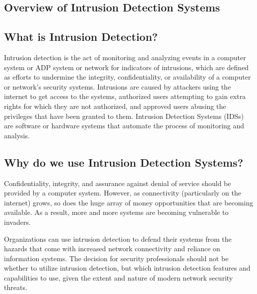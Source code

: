 \documentclass[12pt]{article}
\begin{document}
    \begin{center}
        \huge{\section{Overview of Intrusion Detection Systems}\label{sec:intro}}
    \end{center}
    
    \subsection{What is Intrusion Detection?} 
    \par Intrusion detection is the act of monitoring and analyzing events in a computer system or ADP system or network for indicators of intrusions, which are defined as efforts to undermine the integrity, confidentiality, or availability of a computer or network's security systems. Intrusions are caused by attackers using the internet to get access to the systems, authorized users attempting to gain extra rights for which they are not authorized, and approved users abusing the privileges that have been granted to them. Intrusion Detection Systems (IDSs) are software or hardware systems that automate the process of monitoring and analysis.
    \\
    
    \subsection{Why do we use Intrusion Detection Systems?}
    \par Confidentiality, integrity, and assurance against denial of service should be provided by a computer system. However, as connectivity (particularly on the internet) grows, so does the huge array of money opportunities that are becoming available. As a result, more and more systems are becoming vulnerable to invaders.
    \\
    
    \par Organizations can use intrusion detection to defend their systems from the hazards that come with increased network connectivity and reliance on information systems. The decision for security professionals should not be whether to utilize intrusion detection, but which intrusion detection features and capabilities to use, given the extent and nature of modern network security threats.
    \\
    
\end{document}
